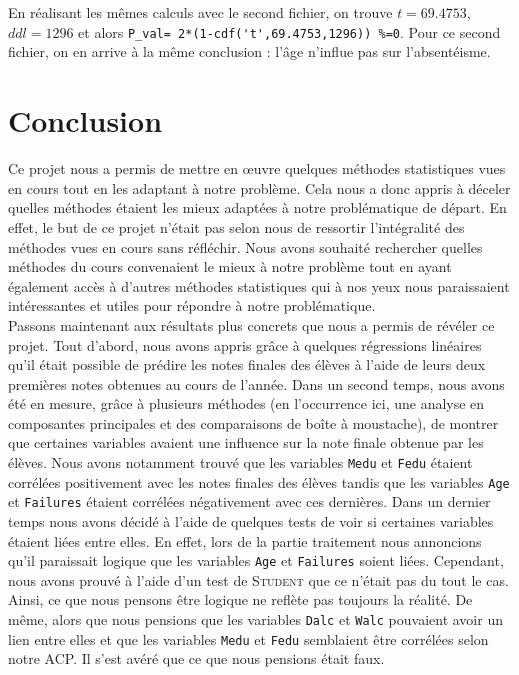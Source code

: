 \documentclass[11pt]{article}
\begin{document}
~\\\\
En réalisant les mêmes calculs avec le second fichier, on trouve $t=69.4753$, $ddl=1296$ et alors \lstinline{P_val= 2*(1-cdf('t',69.4753,1296)) %=0}. 
Pour ce second fichier, on en arrive à la même conclusion : l'âge n'influe pas sur l'absentéisme.


\newpage
\section*{Conclusion}\thispagestyle{mine}
Ce projet nous a permis de mettre en œuvre quelques méthodes statistiques vues en cours tout en les adaptant à notre problème. Cela nous a donc appris à déceler quelles méthodes étaient les mieux adaptées à notre problématique de départ. En effet, le but de ce projet n'était pas selon nous de ressortir l’intégralité des méthodes vues en cours sans réfléchir. Nous avons souhaité rechercher quelles méthodes du cours convenaient le mieux à notre problème tout en ayant également accès à d'autres méthodes statistiques qui à nos yeux nous paraissaient intéressantes et utiles pour répondre à notre problématique. ~\\

Passons maintenant aux résultats plus concrets que nous a permis de révéler ce projet. Tout d'abord, nous avons appris grâce à quelques régressions linéaires qu'il était possible de prédire les notes finales des élèves à l'aide de leurs deux premières notes obtenues au cours de l'année. Dans un second temps, nous avons été en mesure, grâce à plusieurs méthodes (en l'occurrence ici, une analyse en composantes principales et des comparaisons de boîte à moustache), de montrer que certaines variables avaient une influence sur la note finale obtenue par les élèves. Nous avons notamment trouvé que les variables \texttt{Medu} et \texttt{Fedu} étaient corrélées positivement avec les notes finales des élèves tandis que les variables \texttt{Age} et \texttt{Failures} étaient corrélées négativement avec ces dernières. Dans un dernier temps nous avons décidé à l'aide de quelques tests de voir si certaines variables étaient liées entre elles. En effet, lors de la partie traitement nous annoncions qu'il paraissait logique que les variables \texttt{Age} et \texttt{Failures} soient liées. Cependant, nous avons prouvé à l'aide d'un test de \textsc{Student} que ce n'était pas du tout le cas. Ainsi, ce que nous pensons être logique ne reflète pas toujours la réalité. De même, alors que nous pensions que les variables \texttt{Dalc} et \texttt{Walc} pouvaient avoir un lien entre elles et que les variables \texttt{Medu} et \texttt{Fedu} semblaient être corrélées selon notre ACP. Il s'est avéré que ce que nous pensions était faux. 
\end{document}
